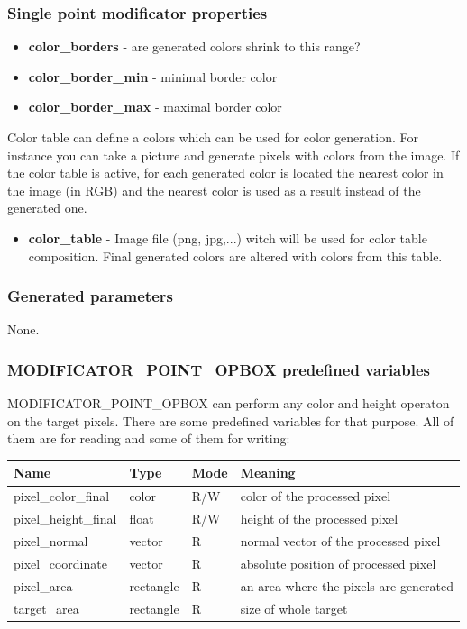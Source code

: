 \documentclass[9pt]{article}
\begin{document}
\subsubsection*{Single point modificator properties}

\begin{itemize}
\item{\bf color\_borders} - are generated colors shrink to this range?
\item{\bf color\_border\_min} - minimal border color
\item{\bf color\_border\_max} - maximal border color
\end{itemize}
Color table can define a colors which can be used for color generation. 
For instance you can take a picture and generate pixels with colors from
the image. If the color table is active, for each generated
color is located the nearest color in the image (in RGB) and the nearest 
color is used as a result instead of the generated one.
\begin{itemize}
\item{\bf color\_table} - Image file (png, jpg,...) witch will be used for 
color table composition. Final generated colors are altered with colors from this table.
\end{itemize}

\subsubsection*{Generated parameters}

None.

\subsubsection*{MODIFICATOR\_POINT\_OPBOX predefined variables}

MODIFICATOR\_POINT\_OPBOX can perform any color and height operaton on the target pixels.
There are some predefined variables for that purpose. All of them are for reading and 
some of them for writing:

\begin{center}
\begin{tabular}{|l||l||l||l|}
\hline
Name & Type & Mode & Meaning \\
\hline
\hline
pixel\_color\_final & color & R/W & color of the processed pixel \\
pixel\_height\_final & float & R/W & height of the processed pixel \\
pixel\_normal & vector & R & normal vector of the processed pixel \\ 
pixel\_coordinate & vector & R & absolute position of processed pixel \\
pixel\_area & rectangle & R & an area where the pixels are generated \\ 
target\_area & rectangle & R & size of whole target \\
\hline
\end{tabular}
\end{center}
\end{document}
